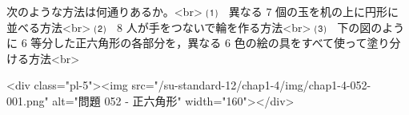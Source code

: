 次のような方法は何通りあるか。<br>
⑴　異なる $7$ 個の玉を机の上に円形に並べる方法<br>
⑵　$8$ 人が手をつないで輪を作る方法<br>
⑶　下の図のように $6$ 等分した正六角形の各部分を，異なる $6$ 色の絵の具をすべて使って塗り分ける方法<br>

<div class="pl-5"><img src="/su-standard-12/chap1-4/img/chap1-4-052-001.png" alt="問題 052 - 正六角形" width="160"></div>
